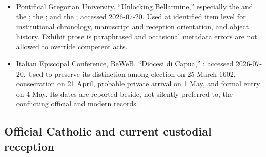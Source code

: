 \begin{itemize}
\item Pontifical Gregorian University.  ``Unlocking Bellarmine,'' especially
the
 and the
; the
; and the
; accessed 2026-07-20.  Used at identified item level
for institutional chronology, manuscript and reception orientation, and
object history.  Exhibit prose is paraphrased and occasional metadata errors
are not allowed to override competent acts.

\item Italian Episcopal Conference, BeWeB.  ``Diocesi di Capua,''
; accessed 2026-07-20.  Used to preserve its distinction
among election on 25 March 1602, consecration on 21 April, probable private
arrival on 1 May, and formal entry on 4 May.  Its dates are reported beside,
not silently preferred to, the conflicting official and modern records.
\end{itemize}

\subsection{Official Catholic and current custodial reception}

